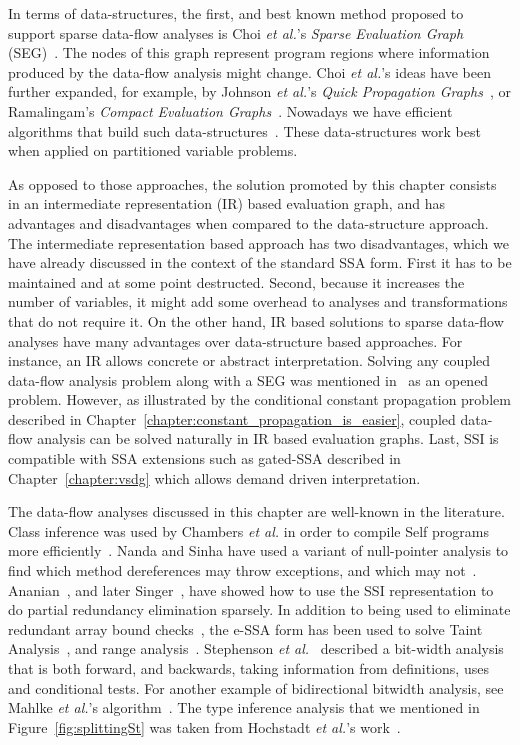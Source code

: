 {In terms of data-structures, the first, and best known method proposed to support sparse data-flow analyses is Choi {\em et al.}'s {\em Sparse Evaluation Graph} (SEG)~\cite{Choi91}.
The nodes of this graph represent program regions where information produced by the data-flow analysis might change.
Choi {\em et al.}'s ideas have been further expanded, for example, by Johnson {\em et al.}'s {\em Quick Propagation Graphs}~\cite{Johnson93}, or Ramalingam's {\em Compact Evaluation Graphs}~\cite{Ramalingam02}.
Nowadays we have efficient algorithms that build such data-structures~\cite{Pingali95,Pingali97,Johnson94}.
These data-structures work best when applied on partitioned variable problems.

As opposed to those approaches, the solution promoted by this chapter consists in an intermediate representation (IR) based evaluation graph, and has advantages and disadvantages when compared to the data-structure approach.
The intermediate representation based approach has two disadvantages, which we have already discussed in the context of the standard SSA form.
First it has to be maintained and at some point destructed.
Second, because it increases the number of variables, it might add some overhead to analyses and transformations that do not require it.
On the other hand, IR based solutions to sparse data-flow analyses have many advantages over data-structure based approaches.
For instance, an IR allows concrete or abstract interpretation.
Solving any coupled data-flow analysis problem along with a SEG was mentioned in~\cite{Choi91} as an opened problem.
However, as illustrated by the conditional constant propagation problem described in Chapter~\ref{chapter:constant_propagation_is_easier}, coupled data-flow analysis can be solved naturally in IR based evaluation graphs.
Last, SSI is compatible with SSA extensions such as gated-SSA described in Chapter~\ref{chapter:vsdg} which allows demand driven interpretation.

The data-flow analyses discussed in this chapter are well-known in the literature.
Class inference was used by Chambers {\em et al.} in order to compile Self programs more efficiently~\cite{Chambers89}.
Nanda and Sinha have used a variant of null-pointer analysis to find which method dereferences may throw exceptions, and which may not~\cite{Nanda09}.
Ananian~\cite{Ananian99}, and later Singer~\cite{Singer06}, have showed how to use the SSI representation to do partial redundancy elimination sparsely.
In addition to being used to eliminate redundant array bound checks~\cite{Bodik00}, the e-SSA form has been used to solve Taint Analysis~\cite{Rimsa11}, and range analysis~\cite{Su05,Gawlitza09}.
Stephenson {\em et al.}~\cite{Stephenson00} described a bit-width analysis that is both forward, and backwards, taking information from definitions, uses and conditional tests.
For another example of bidirectional bitwidth analysis, see Mahlke {\em et al.}'s algorithm~\cite{Mahlke01}.
The type inference analysis that we mentioned in Figure~\ref{fig:splittingSt} was taken from Hochstadt {\em et al.}'s work~\cite{Hochstadt08}.

}
